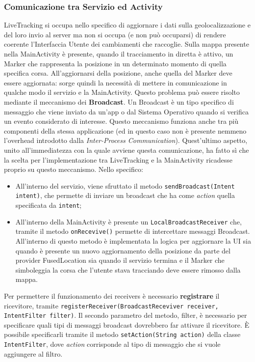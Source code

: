                             \subsubsection{Comunicazione tra Servizio ed Activity}
                                LiveTracking si occupa nello specifico di aggiornare i dati sulla geolocalizzazione e del loro invio al server ma non si occupa (e non può occuparsi) di rendere coerente l'Interfaccia Utente dei cambiamenti che raccoglie. Sulla mappa presente nella MainActivity è presente, quando il tracciamento in diretta è attivo, un Marker che rappresenta la posizione in un determinato momento di quella specifica corsa. All'aggiornarsi della posizione, anche quella del Marker deve essere aggiornata: sorge quindi la necessità di mettere in comunicazione in qualche modo il servizio e la MainActivity. Questo problema può essere risolto mediante il meccanismo dei \textbf{Broadcast}. Un Broadcast è un tipo specifico di messaggio che viene inviato da un'app o dal Sistema Operativo quando si verifica un evento considerato di interesse. Questo meccanismo funziona anche tra più componenti della stessa applicazione (ed in questo caso non è presente nemmeno l'overhead introdotto dalla \textit{Inter-Process Communication}). Quest'ultimo aspetto, unito all'immediatezza con la quale avviene questa comunicazione, ha fatto sì che la scelta per l'implementazione tra LiveTracking e la MainActivity ricadesse proprio su questo meccanismo. Nello specifico: 
                                \begin{itemize}
                                    \item All'interno del servizio, viene sfruttato il metodo \texttt{sendBroadcast(Intent intent)}, che permette di inviare un broadcast che ha come \textit{action} quella specificata da \texttt{intent};
                                    \item All'interno della MainActivity è presente un \texttt{LocalBroadcastReceiver} che, tramite il metodo \texttt{onRecevive()} permette di intercettare messaggi Broadcast. All'interno di questo metodo è implementata la logica per aggiornare la UI sia quando è presente un nuovo aggiornamento della posizione da parte del provider FusedLocation sia quando il servizio termina e il Marker che simboleggia la corsa che l'utente stava tracciando deve essere rimosso dalla mappa.
                                \end{itemize}

                                Per permettere il funzionamento dei receivers è necessario \textbf{registrare} il ricevitore, tramite
                                \texttt{registerReceiver(BroadcastReceviver receiver, IntentFilter filter)}.
                                Il secondo parametro del metodo, filter, è necessario per specificare quali tipi di messaggi broadcast dovrebbero far attivare il ricevitore. È possibile specificarli tramite il metodo \texttt{setAction(String action)} della classe \texttt{IntentFilter}, dove \textit{action} corrisponde al tipo di messaggio che si vuole aggiungere al filtro.              